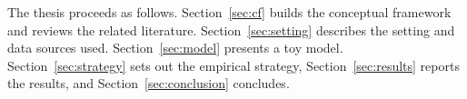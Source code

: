 \noindent The thesis proceeds as follows. Section~\ref{sec:cf} builds the conceptual framework and reviews the related literature. Section~\ref{sec:setting} describes the setting and data sources used. Section~\ref{sec:model} presents a toy model. Section~\ref{sec:strategy} sets out the empirical strategy, Section~\ref{sec:results} reports the results, and Section~\ref{sec:conclusion} concludes.
